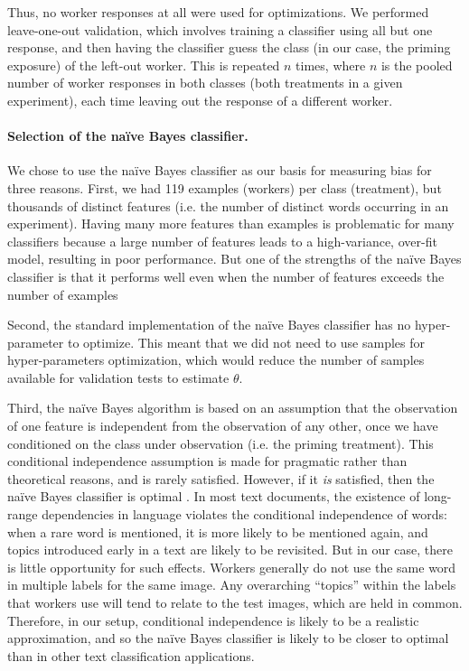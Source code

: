 \documentclass[12pt]{article}
\begin{document}
	Thus, no worker responses at all were used for optimizations.  We 
	performed 
	leave-one-out validation, which involves training a classifier using 
	all but one response, and then having the classifier guess the class
	(in our case, the priming exposure) of the left-out worker.  This is 
	repeated $n$ times, where $n$ is the pooled number of worker responses 
	in both
	classes (both treatments in a given experiment), 
	each time leaving out the response of a different worker.

\paragraph{Selection of the na\"ive Bayes classifier.}
We chose to use the na\"ive Bayes classifier as our basis for measuring 
bias for three reasons.  First, we had 119 examples (workers) per class 
(treatment), but thousands of distinct features 
(i.e. the number of distinct words occurring in an experiment).  
Having many more features than examples is problematic for many classifiers
because a large number of features leads to a high-variance, over-fit model,
resulting in poor performance.  But one of the strengths of the na\"ive 
Bayes classifier is that it performs well even when the number of features
exceeds the number of examples\cite{bickel2004, hastie2009elements}

Second, the standard implementation of the na\"ive Bayes classifier has no 
hyper-parameter to optimize. This meant that we did not need to use 
samples for hyper-parameters optimization, which would reduce the number
of samples available for validation tests to estimate $\theta$.

Third, the na\"ive Bayes algorithm is based on an assumption that the 
observation of one feature is independent from the observation of any 
other, once we have conditioned on the class under observation 
(i.e. the priming treatment).  This
conditional independence assumption is made for
pragmatic rather than theoretical reasons, and is rarely satisfied.  However,
if it \textit{is} satisfied, then the na\"ive Bayes classifier is 
optimal \cite{Zhang2004562}.  In most text documents, 
the existence of long-range dependencies in language 
violates the conditional independence of words: when a rare word is mentioned,
it is more likely to be mentioned again, and topics introduced early in a
text are likely to be revisited.
But in our case, there is little opportunity for such effects.  Workers 
generally do not use the same word in multiple labels for the same image. 
Any overarching ``topics'' within the labels that workers use will tend to 
relate to the test images, which are held in common.
Therefore, in our setup, conditional independence is likely to be 
a realistic approximation, and so the na\"ive Bayes classifier is likely to
be closer to optimal than in other text classification applications.
\end{document}
